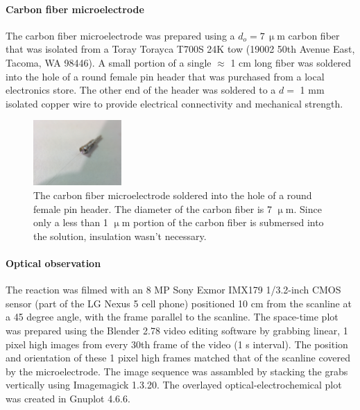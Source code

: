 \documentclass[3p, twocolumn]{elsarticle}
\begin{document}
\paragraph{Carbon fiber microelectrode} The carbon fiber microelectrode was prepared using a $d_o = 7\, \upmu$m carbon fiber that was isolated from a Toray Torayca T700S 24K tow (19002 50th Avenue East, Tacoma, WA 98446).
A small portion of a single $\approx$ 1 cm long fiber was soldered into the hole of a round female pin header that was purchased from a local electronics store. 
The other end of the header was soldered to a $d = $ 1 mm isolated copper wire to provide electrical connectivity and mechanical strength. 

\begin{figure}
\centering
\includegraphics[trim = 200mm 100mm 150mm 200mm, clip, width=0.3\textwidth]{microelectrode.jpg}
\caption{The carbon fiber microelectrode soldered into the hole of a round female pin header. The diameter of the carbon fiber is 7 $\upmu$m. Since only a less than 1 $\upmu$m portion of the carbon fiber is submersed into the solution, insulation wasn't necessary.}
\label{fig:microelectrode}
\end{figure}



\paragraph{Optical observation}
The reaction was filmed with an 8 MP Sony Exmor IMX179 1/3.2-inch CMOS sensor (part of the LG Nexus 5 cell phone) positioned 10 cm from the scanline at a 45 degree angle, with the frame parallel to the scanline.
The space-time plot was prepared using the Blender 2.78 video editing software by grabbing linear, 1 pixel high images from every 30th frame of the video (1 s interval).
The position and orientation of these 1 pixel high frames matched that of the scanline covered by the microelectrode.
The image sequence was assambled by stacking the grabs vertically using Imagemagick 1.3.20.
The overlayed optical-electrochemical plot was created in Gnuplot 4.6.6.

\end{document}
